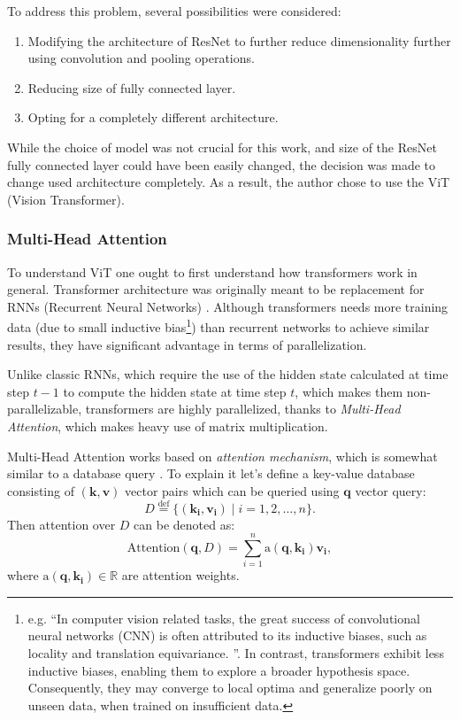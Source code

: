To address this problem, several possibilities were considered:
\begin{enumerate}
    \item Modifying the architecture of ResNet to further reduce dimensionality further using convolution and pooling operations.
    \item Reducing size of fully connected layer.
    \item Opting for a completely different architecture.
\end{enumerate}

While the choice of model was not crucial for this work, and size of the ResNet fully connected layer could have been easily changed, the decision was made to change used architecture completely. 
As a result, the author chose to use the ViT (Vision Transformer).

\subsubsection{Multi-Head Attention}
To understand ViT one ought to first understand how transformers work in general.
Transformer architecture was originally meant to be replacement for RNNs (Recurrent Neural Networks) \cite{Vaswani2017}.
Although transformers needs more training data (due to small inductive bias\footnote{e.g. ``In computer vision related tasks, the great success of convolutional neural networks (CNN) is often attributed to its inductive biases, such as locality and translation equivariance. \cite{Mormille2023}''. 
In contrast, transformers exhibit less inductive biases, enabling them to explore a broader hypothesis space. 
Consequently, they may converge to local optima and generalize poorly on unseen data, when trained on insufficient data.}) 
than recurrent networks to achieve similar results, they have significant advantage in terms of parallelization.

Unlike classic RNNs, which require the use of the hidden state calculated at time step $t-1$ to compute the hidden state at time step $t$, which makes them non-parallelizable, transformers are highly parallelized, thanks to \emph{Multi-Head Attention}, which makes heavy use of matrix multiplication.

Multi-Head Attention works based on \emph{attention mechanism}, which is somewhat similar to a database query \cite{d2lAttentionMechanism}.
To explain it let's define a key-value database consisting of $(\mathbf{k}, \textbf{v})$ vector pairs which can be queried using $\mathbf{q}$ vector query: \[ D\overset{\text{def}}{=}\{(\mathbf{k_i}, \mathbf{v_i}) \mid i = 1, 2, \ldots, n\}.\]
Then attention over $D$ can be denoted as:
\[ \text{Attention}(\mathbf{q}, D) = \sum_{i=1}^{n}\text{a}(\mathbf{q}, \mathbf{k_i})\mathbf{v_i},\]
where $\text{a}(\mathbf{q}, \mathbf{k_i}) \in \mathbb{R}$ are attention weights.

